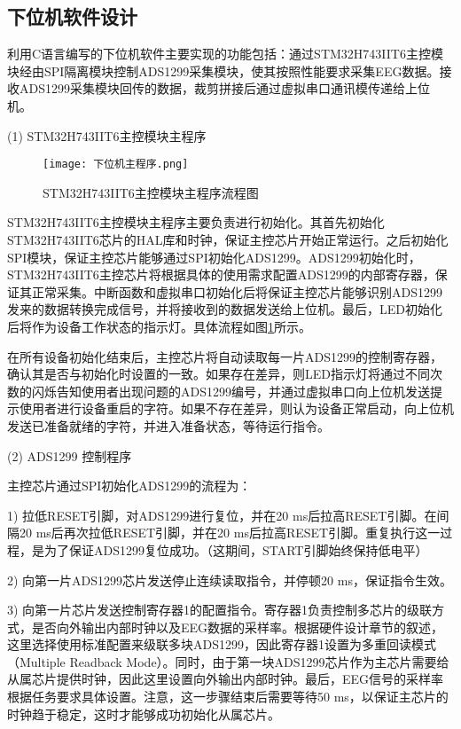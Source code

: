 \subsection{下位机软件设计}
利用C语言编写的下位机软件主要实现的功能包括：通过STM32H743IIT6主控模块经由SPI隔离模块控制ADS1299采集模块，使其按照性能要求采集EEG数据。接收ADS1299采集模块回传的数据，裁剪拼接后通过虚拟串口通讯模传递给上位机。

(1) STM32H743IIT6主控模块主程序

\begin{figure}[h]
	\centering
	\texttt{[image: 下位机主程序.png]}
	\caption{STM32H743IIT6主控模块主程序流程图} 
	\label{fig2-19}
\end{figure}

STM32H743IIT6主控模块主程序主要负责进行初始化。其首先初始化STM32H743IIT6芯片的HAL库和时钟，保证主控芯片开始正常运行。之后初始化SPI模块，保证主控芯片能够通过SPI初始化ADS1299。ADS1299初始化时，STM32H743IIT6主控芯片将根据具体的使用需求配置ADS1299的内部寄存器，保证其正常采集。中断函数和虚拟串口初始化后将保证主控芯片能够识别ADS1299发来的数据转换完成信号，并将接收到的数据发送给上位机。最后，LED初始化后将作为设备工作状态的指示灯。具体流程如图\ref{fig2-19}所示。

在所有设备初始化结束后，主控芯片将自动读取每一片ADS1299的控制寄存器，确认其是否与初始化时设置的一致。如果存在差异，则LED指示灯将通过不同次数的闪烁告知使用者出现问题的ADS1299编号，并通过虚拟串口向上位机发送提示使用者进行设备重启的字符。如果不存在差异，则认为设备正常启动，向上位机发送已准备就绪的字符，并进入准备状态，等待运行指令。


(2) ADS1299 控制程序

主控芯片通过SPI初始化ADS1299的流程为：

1) 拉低RESET引脚，对ADS1299进行复位，并在20 ms后拉高RESET引脚。在间隔20 ms后再次拉低RESET引脚，并在20 ms后拉高RESET引脚。重复执行这一过程，是为了保证ADS1299复位成功。（这期间，START引脚始终保持低电平）

2) 向第一片ADS1299芯片发送停止连续读取指令，并停顿20 ms，保证指令生效。

3) 向第一片芯片发送控制寄存器1的配置指令。寄存器1负责控制多芯片的级联方式，是否向外输出内部时钟以及EEG数据的采样率。根据硬件设计章节的叙述，这里选择使用标准配置来级联多块ADS1299，因此寄存器1设置为多重回读模式（Multiple Readback Mode）。同时，由于第一块ADS1299芯片作为主芯片需要给从属芯片提供时钟，因此这里设置向外输出内部时钟。最后，EEG信号的采样率根据任务要求具体设置。注意，这一步骤结束后需要等待50 ms，以保证主芯片的时钟趋于稳定，这时才能够成功初始化从属芯片。

